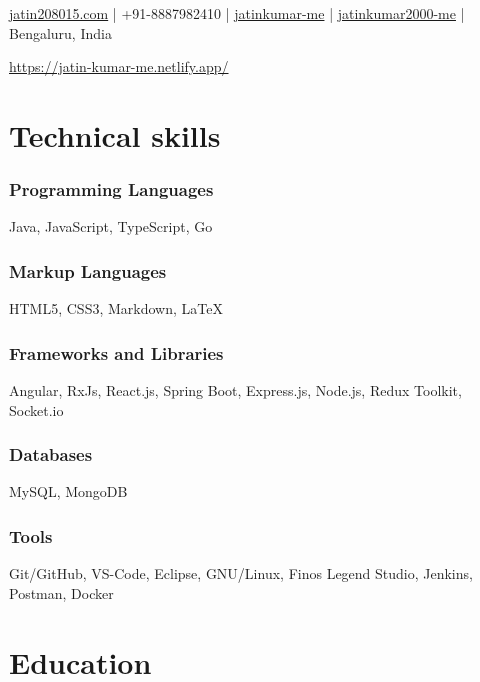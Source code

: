 \documentclass[a4paper]{article}
\author{Jatin Kumar}
\begin{document}
\begin{center}
	\makeatletter
	\centering {\huge \@author}
	\makeatother
	\vspace{6pt}

	\href{mailto:jatin208015\@gmail.com}{{\faAt} jatin208015\@gmail.com} |
	{\faPhone } +91-8887982410 |
	\href{https://github.com/jatinkumar-me}{{\faGithub} jatinkumar-me} |
	\href{https://www.linkedin.com/in/jatinkumar-2000-me/}{{\faLinkedin} {jatinkumar2000-me}} |
	{\faMapMarker} Bengaluru, India

	\href{https://jatin-kumar-me.netlify.app/}{{\faGlobe} https://jatin-kumar-me.netlify.app/}
\end{center}

\vspace{-13pt}
\hrulefill

\section{Technical skills}
\subsubsection*{Programming Languages}
Java, JavaScript, TypeScript, Go
\vspace{-10pt}
\subsubsection*{Markup Languages}
HTML5, CSS3, Markdown, \LaTeX
\vspace{-10pt}
\subsubsection*{Frameworks and Libraries}
Angular, RxJs, React.js, Spring Boot, Express.js, Node.js, Redux Toolkit, Socket.io
\vspace{-10pt}
\subsubsection*{Databases}
MySQL, MongoDB
\vspace{-10pt}
\subsubsection*{Tools}
Git/GitHub, VS-Code, Eclipse, GNU/Linux, Finos Legend Studio, Jenkins, Postman, Docker

\section{Education}
\end{document}
